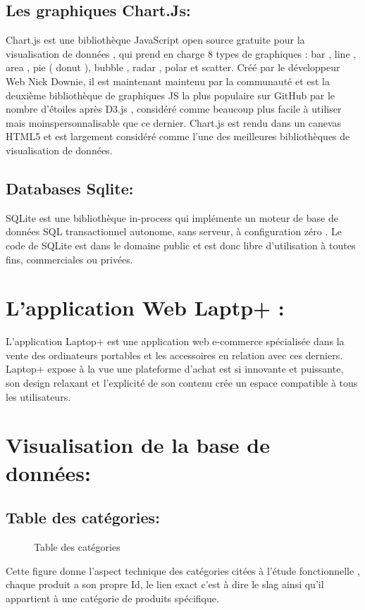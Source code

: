 \documentclass[a4paper]{report}
\begin{document}
\begin{doublespace}
	\subsection{ Les graphiques Chart.Js:}
	\begin{figure}[H]
		\raggedleft{
		}
	\end{figure}
	Chart.js est une bibliothèque JavaScript open source
	gratuite pour la visualisation de données , qui prend en charge 8 types de
	graphiques : bar , line , area , pie ( donut ), bubble , radar , polar et
	scatter. Créé par le développeur Web  Nick Downie, il est maintenant maintenu
	par la communauté et est la deuxième bibliothèque de graphiques JS la plus
	populaire sur GitHub par le nombre d'étoiles après D3.js , considéré comme
	beaucoup plus facile à utiliser mais moinspersonnalisable que ce dernier.
	Chart.js est rendu dans un canevas HTML5 et est largement considéré comme l'une
	des meilleures bibliothèques de visualisation de données.
	\subsection{Databases Sqlite:}
	\begin{figure}[H]
		\raggedleft{
		}
	\end{figure}
	SQLite est une bibliothèque in-process qui implémente
	un moteur de base de données SQL transactionnel autonome, sans serveur, à
	configuration zéro . Le code de SQLite est dans le domaine public et est donc
	libre d'utilisation à toutes fins, commerciales ou privées.
	\newpage
	\section{L'application Web Laptp+ :}
	L'application Laptop+ est une application web
	e-commerce spécialisée dans la vente des ordinateurs portables et les
	accessoires en relation avec ces derniers. \\Laptop+ expose à la vue une
	plateforme d'achat est si innovante et puissante, son design relaxant et
	l’explicité de son contenu crée un espace compatible à tous les utilisateurs.

	\section{ Visualisation de la base de données:}
	\subsection{ Table des catégories: }
	\begin{figure}[H]
		\caption{Table des catégories}
	\end{figure}
	Cette figure donne l'aspect technique des catégories
	citées à l'étude
	fonctionnelle , chaque produit a son propre Id, le lien
	exact c'est à dire le slag ainsi qu'il appartient à une catégorie de produits
	spécifique.

\end{doublespace}
\end{document}
